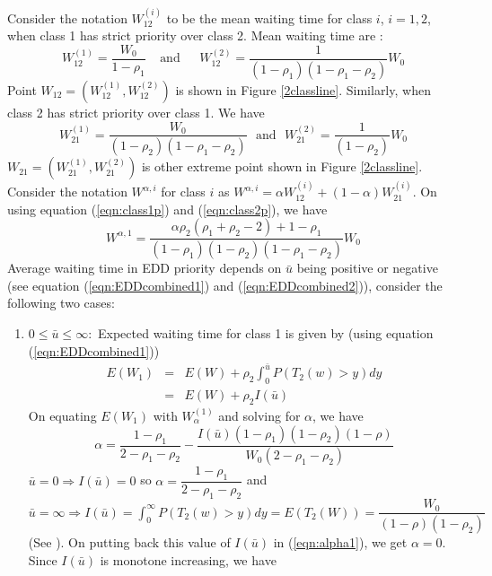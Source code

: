 \documentclass[letterpaper, 10 pt, conference]{ieeeconf}  %
\newenvironment{mythm}[1]{{ \textbf{\textit{Proof of Theorem #1:}}}}{}
\begin{document}
\begin{appendices}
\begin{mythm}{\ref{clm:EDDcomplete}}
Consider the notation $W_{12}^{(i)}$ to be the mean waiting time for class $i$, $i=1,2$,  when class 1 has strict priority over class 2. Mean waiting time are \cite{cobham}:
\begin{equation}
W_{12}^{(1)} = \dfrac{W_0}{1 - \rho_1}~~~~~\text{and}~~~~~~~W_{12}^{(2)} = \dfrac{1}{(1 - \rho_1)(1 - \rho_1 - \rho_2)}W_0
\label{eqn:class1p}
\end{equation}
Point $W_{12} = (W_{12}^{(1)}, W_{12}^{(2)})$  is shown in Figure \ref{2classline}. Similarly, when class 2 has strict priority over class 1. We have
\begin{equation}
W_{21}^{(1)} = \dfrac{W_0}{(1 - \rho_2)(1 - \rho_1 - \rho_2)}~~~\text{and}~~~W_{21}^{(2)} = \dfrac{1}{(1 - \rho_2)}W_0
\label{eqn:class2p}
\end{equation}
$W_{21} = (W_{21}^{(1)}, W_{21}^{(2)})$ is other extreme point shown in Figure \ref{2classline}. Consider the notation $W^{\alpha, i}$ for class $i$ as $W^{\alpha, i} = \alpha W_{12}^{(i)} + (1-\alpha)W_{21}^{(i)}$. On using equation (\ref{eqn:class1p}) and (\ref{eqn:class2p}), we have
\begin{equation}
W^{\alpha, 1} = \dfrac{\alpha \rho_2 (\rho_1 + \rho_2 	- 2) + 1-\rho_1 }{(1 - \rho_1)(1 - \rho_2)(1 - \rho_1 - \rho_2)}W_0
\end{equation}
Average waiting time in EDD priority depends on $\bar{u}$ being positive or negative (see equation (\ref{eqn:EDDcombined1}) and (\ref{eqn:EDDcombined2})), consider the following two cases:
\begin{enumerate}
\item $0 \leq \bar{u} \leq \infty:$ Expected waiting time for class 1 is given by (using equation (\ref{eqn:EDDcombined1}))
\begin{eqnarray}\nonumber
E(W_1) &=& E(W) + \rho_2 \int_0^{\bar{u}}P(T_2(w)> y)dy\\
 &=& E(W) + \rho_2 I(\bar{u})\nonumber
\end{eqnarray}
On equating $E(W_1)$ with $W_{\alpha}^{(1)}$ and solving for $\alpha$, we have
\begin{equation}\label{eqn:alpha1}
\alpha = \dfrac{1-\rho_1}{2-\rho_1 -\rho_2} - \dfrac{I(\bar{u})(1-\rho_1)(1-\rho_2)(1-\rho)}{W_0(2-\rho_1 - \rho_2)}
\end{equation}
$\bar{u} = 0 \Rightarrow  I(\bar{u}) = 0$ so $\alpha = \dfrac{1-\rho_1}{2-\rho_1-\rho_2}$ and $\bar{u} = \infty \Rightarrow I(\bar{u}) = \int_0^{\infty}P(T_2(w)> y)dy = E(T_2(W)) = \dfrac{W_0}{(1-\rho)(1-\rho_2)}$ (See \cite[page 152]{EDDpriority}). On putting back this value of $I(\bar{u})$ in (\ref{eqn:alpha1}), we get $\alpha = 0$. Since $I(\bar{u})$ is monotone increasing, we have 

\end{enumerate}
\end{mythm}
\end{appendices}
\end{document}
